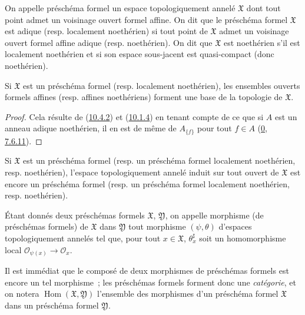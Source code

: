 \begin{definition}[10.4.2]
\label{I.10.4.2-fr}
On appelle préschéma formel un espace topologiquement annelé $\mathfrak{X}$
dont tout point admet un voisinage ouvert formel affine. On dit que le
préschéma formel $\mathfrak{X}$ est adique (resp. localement noethérien) si
tout point de $\mathfrak{X}$ admet un voisinage ouvert formel affine adique
(resp. noethérien). On dit que $\mathfrak{X}$ est noethérien s'il est
localement noethérien et si son espace sous-jacent est quasi-compact (donc
noethérien).
\end{definition}

\begin{proposition}[10.4.3]
\label{I.10.4.3-fr}
Si $\mathfrak{X}$ est un préschéma formel (resp. localement noethérien),
les ensembles ouverts formels affines (resp. affines noethériens) forment
une base de la topologie de $\mathfrak{X}$.
\end{proposition}

\begin{proof}
Cela résulte de (\hyperref[I.10.4.2-fr]{10.4.2}) et
(\hyperref[I.10.1.4-fr]{10.1.4}) en tenant compte de ce que si $A$ est un
anneau adique noethérien, il en est de même de $A_{\{f\}}$ pour tout
$f\in A$ (\hyperref[0.7.6.11-fr]{0, 7.6.11}).
\end{proof}

\begin{corollary}[10.4.4]
\label{I.10.4.4-fr}
Si $\mathfrak{X}$ est un préschéma formel (resp. un préschéma formel
localement noethérien, resp. noethérien), l'espace topologiquement annelé
induit sur tout ouvert de $\mathfrak{X}$ est encore un préschéma formel
(resp. un préschéma formel localement noethérien, resp. noethérien).
\end{corollary}

\begin{definition}[10.4.5]
\label{I.10.4.5-fr}
Étant donnés deux préschémas formels $\mathfrak{X}$, $\mathfrak{Y}$, on
appelle morphisme (de préschémas formels) de $\mathfrak{X}$ dans
$\mathfrak{Y}$ tout morphisme $(\psi,\theta)$ d'espaces topologiquement
annelés tel que, pour tout $x\in\mathfrak{X}$, $\theta_x^\sharp$ soit un
homomorphisme local
$\mathscr{O}_{\psi(x)}\to\mathscr{O}_x$.
\end{definition}

Il est immédiat que le composé de deux morphismes de préschémas formels est
encore un tel morphisme~; les préschémas formels forment donc une
\emph{catégorie}, et on notera
$\operatorname{Hom}(\mathfrak{X},\mathfrak{Y})$ l'ensemble des morphismes
d'un préschéma formel $\mathfrak{X}$ dans un préschéma formel
$\mathfrak{Y}$.

